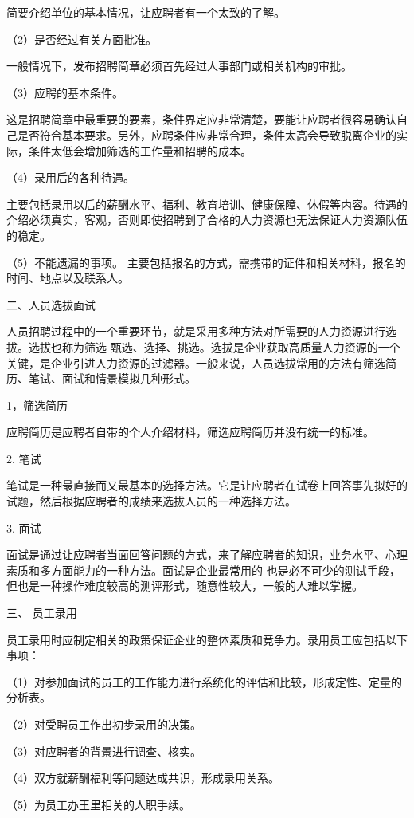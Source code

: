     简要介绍单位的基本情况，让应聘者有一个太致的了解。

    （2）是否经过有关方面批准。

    一般情况下，发布招聘简章必须首先经过人事部门或相关机构的审批。

    （3）应聘的基本条件。

    这是招聘简章中最重要的要素，条件界定应非常清楚，要能让应聘者很容易确认自己是否符合基本要求。另外，应聘条件应非常合理，条件太高会导致脱离企业的实际，条件太低会增加筛选的工作量和招聘的成本。

    （4）录用后的各种待遇。

    主要包括录用以后的薪酬水平、福利、教育培训、健康保障、休假等内容。待遇的介绍必须真实，客观，否则即使招聘到了合格的人力资源也无法保证人力资源队伍的稳定。

    （5）不能遗漏的事项。
    主要包括报名的方式，需携带的证件和相关材科，报名的时间、地点以及联系人。

二、人员选拔面试

    人员招聘过程中的一个重要环节，就是采用多种方法对所需要的人力资源进行选拔。选拔也称为筛选 甄选、选择、挑选。选拔是企业获取高质量人力资源的一个关键，是企业引进人力资源的过滤器。一般来说，人员选拔常用的方法有筛选简历、笔试、面试和情景模拟几种形式。

    1，筛选简历

    应聘简历是应聘者自带的个人介绍材料，筛选应聘简历并没有统一的标准。

    2. 笔试

    笔试是一种最直接而又最基本的选择方法。它是让应聘者在试卷上回答事先拟好的试题，然后根据应聘者的成绩来选拔人员的一种选择方法。

    3. 面试

    面试是通过让应聘者当面回答问题的方式，来了解应聘者的知识，业务水平、心理素质和多方面能力的一种方法。面试是企业最常用的 也是必不可少的测试手段，但也是一种操作难度较高的测评形式，随意性较大，一般的人难以掌握。

三、 员工录用

    员工录用时应制定相关的政策保证企业的整体素质和竞争力。录用员工应包括以下事项：

    （1）对参加面试的员工的工作能力进行系统化的评估和比较，形成定性、定量的分析表。

    （2）对受聘员工作出初步录用的决策。

    （3）对应聘者的背景进行调查、核实。

    （4）双方就薪酬福利等问题达成共识，形成录用关系。

    （5）为员工办王里相关的人职手续。

